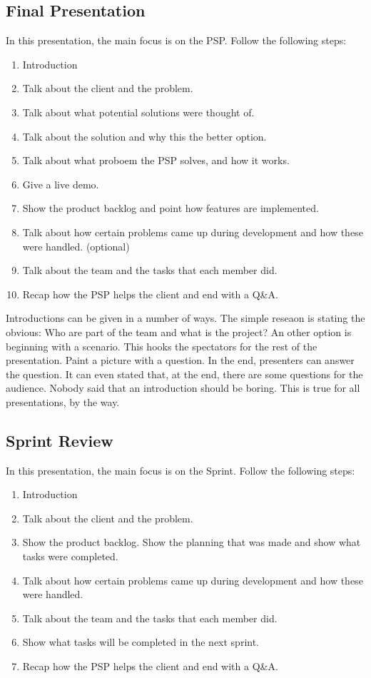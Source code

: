\documentclass[10pt]{report}
\begin{document}
\subsection{Final Presentation}

In this presentation, the main focus is on the PSP. Follow the following steps:

\begin{enumerate}
	\item Introduction
	\item Talk about the client and the problem.
	\item Talk about what potential solutions were thought of.
	\item Talk about the solution and why this the better option.
	\item Talk about what proboem the PSP solves, and how it works.
	\item Give a live demo.
	\item Show the product backlog and point how features are implemented.
	\item Talk about how certain problems came up during development and how these were handled. (optional)
	\item Talk about the team and the tasks that each member did.
	\item Recap how the PSP helps the client and end with a Q\&A.
\end{enumerate}

\noindent Introductions can be given in a number of ways. The simple reseaon is stating the obvious: Who are part of the team and what is the project? An other option is beginning with a scenario. This hooks the spectators for the rest of the presentation. Paint a picture with a question. In the end, presenters can answer the question. It can even stated that, at the end, there are some questions for the audience. Nobody said that an introduction should be boring. This is true for all presentations, by the way.

\subsection{Sprint Review}

In this presentation, the main focus is on the Sprint. Follow the following steps:

\begin{enumerate}
	\item Introduction
	\item Talk about the client and the problem.
	\item Show the product backlog. Show the planning that was made and show what tasks were completed.
	\item Talk about how certain problems came up during development and how these were handled.
	\item Talk about the team and the tasks that each member did.
	\item Show what tasks will be completed in the next sprint.
	\item Recap how the PSP helps the client and end with a Q\&A.
\end{enumerate}
\end{document}
